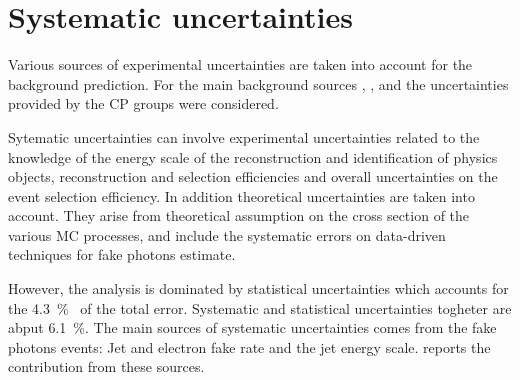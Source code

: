   

\section{Systematic uncertainties}
Various sources of experimental uncertainties are taken into account for the background prediction. For the main background sources \znng, \zg, \wg and \gj the uncertainties provided by the CP groups were considered.

Sytematic uncertainties can involve experimental uncertainties related to the knowledge of the energy scale of the reconstruction and identification of physics objects, reconstruction and selection efficiencies and overall uncertainties on the event selection efficiency. In addition theoretical uncertainties are taken into account. They arise from theoretical assumption on the cross section of the various MC processes, and include the systematic errors on data-driven techniques for fake photons estimate.


However, the \mph analysis is dominated by statistical uncertainties which accounts for the \SI{4.3}{\percent}~\cite{paperMP} of the total error. Systematic and statistical uncertainties togheter are abput \SI{6.1}{\percent}. The main sources of systematic uncertainties comes from the fake photons events: Jet and electron fake rate and the jet energy scale. \Tab{\ref{table:sys}} reports the contribution from these sources.


